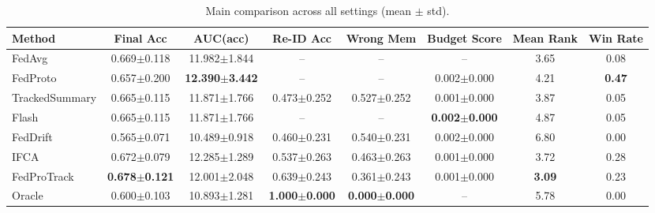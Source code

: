 \begin{table}[t]
\centering
\caption{Main comparison across all settings (mean $\pm$ std).}
\label{tab:main}
\begin{tabular}{lccccccc}
\toprule
Method & Final Acc & AUC(acc) & Re-ID Acc & Wrong Mem & Budget Score & Mean Rank & Win Rate \\
\midrule
FedAvg & 0.669$\pm$0.118 & 11.982$\pm$1.844 & -- & -- & -- & 3.65 & 0.08 \\
FedProto & 0.657$\pm$0.200 & \textbf{12.390$\pm$3.442} & -- & -- & 0.002$\pm$0.000 & 4.21 & \textbf{0.47} \\
TrackedSummary & 0.665$\pm$0.115 & 11.871$\pm$1.766 & 0.473$\pm$0.252 & 0.527$\pm$0.252 & 0.001$\pm$0.000 & 3.87 & 0.05 \\
Flash & 0.665$\pm$0.115 & 11.871$\pm$1.766 & -- & -- & \textbf{0.002$\pm$0.000} & 4.87 & 0.05 \\
FedDrift & 0.565$\pm$0.071 & 10.489$\pm$0.918 & 0.460$\pm$0.231 & 0.540$\pm$0.231 & 0.002$\pm$0.000 & 6.80 & 0.00 \\
IFCA & 0.672$\pm$0.079 & 12.285$\pm$1.289 & 0.537$\pm$0.263 & 0.463$\pm$0.263 & 0.001$\pm$0.000 & 3.72 & 0.28 \\
FedProTrack & \textbf{0.678$\pm$0.121} & 12.001$\pm$2.048 & 0.639$\pm$0.243 & 0.361$\pm$0.243 & 0.001$\pm$0.000 & \textbf{3.09} & 0.23 \\
Oracle & 0.600$\pm$0.103 & 10.893$\pm$1.281 & \textbf{1.000$\pm$0.000} & \textbf{0.000$\pm$0.000} & -- & 5.78 & 0.00 \\
\bottomrule
\end{tabular}
\end{table}